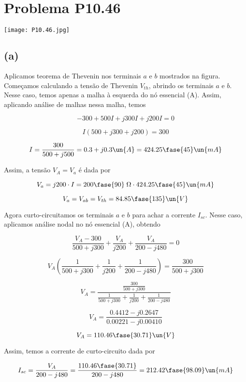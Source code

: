 
\section*{Problema P10.46}

\renewcommand*\thesection{10.46}

\begin{center}
    \texttt{[image: P10.46.jpg]}
\end{center}

\subsection*{(a)}

Aplicamos teorema de Thevenin nos terminais $a$ e $b$ mostrados na figura. \\
Começamos calculando a tensão de Thevenin $V_{th}$, abrindo os terminais $a$ e $b$. Nesse caso, temos apenas a malha à esquerda
do nó essencial (A). Assim, aplicando análise de malhas nessa malha, temos

\[ -300 + 500I + j300I + j200I = 0 \]

\[ I(500 + j300 + j200) = 300 \]

\[ I = \frac{300}{500 + j500} = 0.3 + j0.3 \un{A} = 424.25\fase{45} \un{mA}\]

Assim, a tensão $V_A = V_a$ é dada por   

\[ V_a = j200 \cdot I = 200\fase{90} \;\Omega \cdot 424.25\fase{45} \un{mA}\]

\[ V_a = V_{ab} = V_{th} = 84.85\fase{135} \un{V}\]

Agora curto-circuitamos os terminais $a$ e $b$ para achar a corrente $I_{sc}$. Nesse caso, aplicamos análise nodal no nó
essencial (A), obtendo

\[ \frac{V_A - 300}{500 + j300} + \frac{V_A}{j200} + \frac{V_A}{200 - j480} = 0 \]

\[ V_A\left(\frac{1}{500 + j300} + \frac{1}{j200} + \frac{1}{200 - j480}\right) = \frac{300}{500 + j300} \]

\[ V_A = \frac{\frac{300}{500 + j300}}{\frac{1}{500 + j300} + \frac{1}{j200} + \frac{1}{200 - j480}} \]

\[ V_A = \frac{0.4412 - j0.2647}{0.00221 - j0.00410} \]

\[ V_A = 110.46\fase{30.71} \un{V} \]

Assim, temos a corrente de curto-circuito dada por

\[ I_{sc} = \frac{V_A}{200 - j480} = \frac{110.46\fase{30.71}}{200 - j480} = 212.42\fase{98.09}\un{mA} \]

